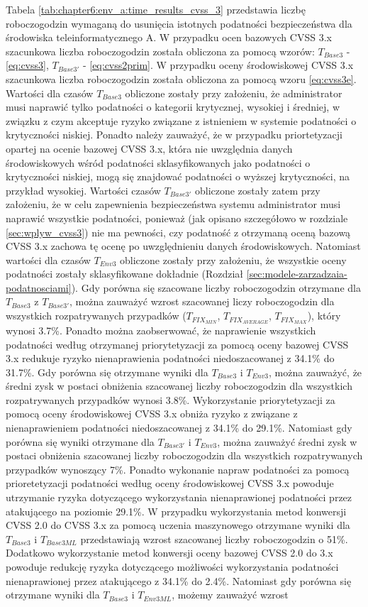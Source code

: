 \bigbreak
Tabela \ref{tab:chapter6:env_a:time_results_cvss_3} przedstawia liczbę roboczogodzin wymaganą do usunięcia istotnych podatności bezpieczeństwa dla środowiska teleinformatycznego A. W przypadku ocen bazowych CVSS 3.x szacunkowa liczba roboczogodzin została obliczona za pomocą wzorów: $T_{Base3}$ - \ref{eq:cvss3}, $T_{Base3'}$ - \ref{eq:cvss2prim}. W przypadku oceny środowiskowej CVSS 3.x szacunkowa liczba roboczogodzin została obliczona za pomocą wzoru \ref{eq:cvss3e}. Wartości dla czasów $T_{Base3}$ obliczone zostały przy założeniu, że administrator musi naprawić tylko podatności o kategorii krytycznej, wysokiej i średniej, w związku z czym akceptuje ryzyko związane z istnieniem w systemie podatności o krytyczności niskiej. Ponadto należy zauważyć, że w przypadku priortetyzacji opartej na ocenie bazowej CVSS 3.x, która nie uwzględnia danych środowiskowych wśród podatności sklasyfikowanych jako podatności o krytyczności niskiej, mogą się znajdować podatności o wyższej krytyczności, na przykład wysokiej. Wartości czasów $T_{Base3'}$ obliczone zostały zatem przy założeniu, że w celu zapewnienia bezpieczeństwa systemu administrator musi naprawić wszystkie podatności, ponieważ (jak opisano szczegółowo w rozdziale \ref{sec:wplyw_cvss3}) nie ma pewności, czy podatność z otrzymaną oceną bazową CVSS 3.x zachowa tę ocenę po uwzględnieniu danych środowiskowych. Natomiast wartości dla czasów $T_{Env3}$ obliczone zostały przy założeniu, że wszystkie oceny podatności zostały sklasyfikowane dokładnie (Rozdział \ref{sec:modele-zarzadzaia-podatnosciami}). Gdy porówna się szacowane liczby roboczogodzin otrzymane dla $T_{Base3}$ z $T_{Base3'}$, można zauważyć wzrost szacowanej liczy roboczogodzin dla wszystkich rozpatrywanych przypadków ($T_{FIX_{MIN}}$, $T_{FIX_{AVERAGE}}$, $T_{FIX_{MAX}}$), który wynosi 3.7\%. Ponadto można zaobserwować, że naprawienie wszystkich podatności według otrzymanej priorytetyzacji za pomocą oceny bazowej CVSS 3.x redukuje ryzyko nienaprawienia podatności niedoszacowanej z 34.1\% do 31.7\%. Gdy porówna się otrzymane wyniki dla $T_{Base3}$ i $T_{Env3}$, można zauważyć, że średni zysk w postaci obniżenia szacowanej liczby roboczogodzin dla wszystkich rozpatrywanych przypadków wynosi 3.8\%. Wykorzystanie priorytetyzacji za pomocą oceny środowiskowej CVSS 3.x obniża ryzyko z związane z nienaprawieniem podatności niedoszacowanej z 34.1\% do 29.1\%. Natomiast gdy porówna się wyniki otrzymane dla $T_{Base3'}$ i $T_{Env3}$, można zauważyć średni zysk w postaci obniżenia szacowanej liczby roboczogodzin dla wszystkich rozpatrywanych przypadków wynoszący 7\%. Ponadto wykonanie napraw podatności za pomocą prioretetyzacji podatności według oceny środowiskowej CVSS 3.x powoduje utrzymanie ryzyka dotyczącego wykorzystania nienaprawionej podatności przez atakującego na poziomie 29.1\%. W przypadku wykorzystania metod konwersji CVSS 2.0 do CVSS 3.x za pomocą uczenia maszynowego otrzymane wyniki dla $T_{Base3}$ i $T_{Base3ML}$ przedstawiają wzrost szacowanej liczby roboczogodzin o 51\%. Dodatkowo wykorzystanie metod konwersji oceny bazowej CVSS 2.0 do 3.x powoduje redukcję ryzyka dotyczącego możliwości wykorzystania podatności nienaprawionej przez atakującego z 34.1\% do 2.4\%. Natomiast gdy porówna się otrzymane wyniki dla $T_{Base3}$ i $T_{Env3ML}$, możemy zauważyć wzrost 